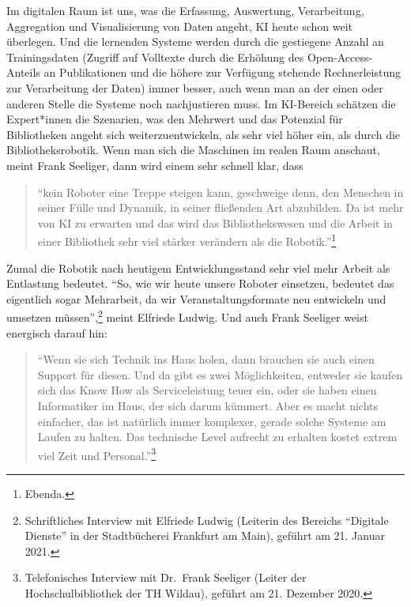\documentclass[a4paper,
fontsize=11pt,
oneside,
numbers=noperiodatend,
parskip=half-,
bibliography=totoc,
final
]{scrartcl}
\begin{document}
Im digitalen Raum ist uns, was die Erfassung, Auswertung, Verarbeitung,
Aggregation und Visualisierung von Daten angeht, KI heute schon weit
überlegen. Und die lernenden Systeme werden durch die gestiegene Anzahl
an Trainingsdaten (Zugriff auf Volltexte durch die Erhöhung des Open-Access-Anteils an Publikationen und die höhere zur Verfügung stehende
Rechnerleistung zur Verarbeitung der Daten) immer besser, auch wenn man
an der einen oder anderen Stelle die Systeme noch nachjustieren muss. Im
KI-Bereich schätzen die Expert*innen die Szenarien, was den Mehrwert und
das Potenzial für Bibliotheken angeht sich weiterzuentwickeln, als sehr
viel höher ein, als durch die Bibliotheksrobotik. Wenn man sich die
Maschinen im realen Raum anschaut, meint Frank Seeliger, dann wird einem
sehr schnell klar, dass 

\begin{quote}
\enquote{kein Roboter eine Treppe steigen kann,
geschweige denn, den Menschen in seiner Fülle und Dynamik, in seiner
fließenden Art abzubilden. Da ist mehr von KI zu erwarten und das wird
das Bibliothekswesen und die Arbeit in einer Bibliothek sehr viel
stärker verändern als die Robotik.}\footnote{Ebenda.} 
\end{quote}

Zumal die Robotik
nach heutigem Entwicklungsstand sehr viel mehr Arbeit als Entlastung
bedeutet. \enquote{So, wie wir heute unsere Roboter einsetzen, bedeutet
das eigentlich sogar Mehrarbeit, da wir Veranstaltungsformate neu
entwickeln und umsetzen müssen},\footnote{Schriftliches Interview mit
  Elfriede Ludwig (Leiterin des Bereichs \enquote{Digitale Dienste} in der
  Stadtbücherei Frankfurt am Main), geführt am 21. Januar 2021.} meint
Elfriede Ludwig. Und auch Frank Seeliger weist energisch darauf hin:

\begin{quote}
\enquote{Wenn sie sich Technik ins Haus holen, dann brauchen sie auch
einen Support für diesen. Und da gibt es zwei Möglichkeiten, entweder
sie kaufen sich das Know How als Serviceleistung teuer ein, oder sie
haben einen Informatiker im Haus, der sich darum kümmert. Aber es macht
nichts einfacher, das ist natürlich immer komplexer, gerade solche
Systeme am Laufen zu halten. Das technische Level aufrecht zu erhalten
kostet extrem viel Zeit und Personal.}\footnote{Telefonisches Interview
  mit Dr.~Frank Seeliger (Leiter der Hochschulbibliothek der TH Wildau),
  geführt am 21. Dezember 2020.}
\end{quote}
\end{document}
